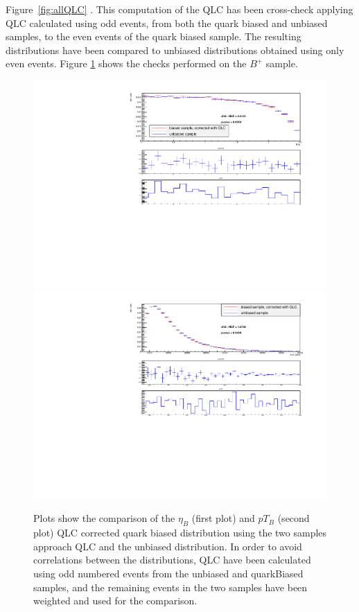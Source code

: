 Figure~\ref{fig:allQLC}  .
This computation of the QLC has been cross-check applying 
QLC calculated using odd events, from both the quark biased and 
unbiased samples, to the even events of the quark biased sample. 
The resulting distributions have been compared to unbiased 
distributions obtained using only even events. 
Figure \ref{fig:BpQLCapplied_twoSample} 
shows the checks performed on the $B^+$ sample.
\begin{figure}[h]
  \centering
  \includegraphics[width=15cm]{figures/InternalNote_MCTuning/twoSampleApproachApplication_etacomparison.pdf}\\
  \vspace{0.5cm}
  \includegraphics[width=15cm]{figures/InternalNote_MCTuning/twoSampleApproachApplication_pTcomparison.pdf}
  \caption{Plots show the comparison of the $\eta_B$ (first plot) and $pT_B$ (second plot) QLC corrected quark biased distribution using the two samples approach QLC and the unbiased distribution. In order to avoid correlations between the distributions, QLC have been calculated using odd numbered events from the unbiased and quarkBiased samples, and the remaining events in the two samples have been weighted and used for the comparison.}
  \label{fig:BpQLCapplied_twoSample}
\end{figure}
